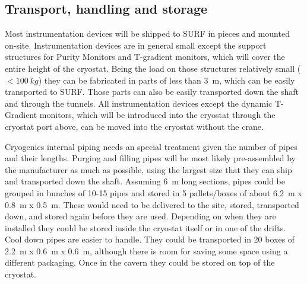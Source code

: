 \subsection{Transport, handling and storage}
\label{sec:fdgen-slow-cryo-install-transport}

Most instrumentation devices will be shipped to SURF in pieces and mounted on-site. 
Instrumentation devices are in general small except the support structures for Purity Monitors and T-gradient monitors,
which will cover the entire height of the cryostat. Being the load on those structures relatively small (\(<\SI{100}{kg}\)) they can be fabricated in parts of less than \SI{3}{m},
which can be easily transported to SURF. Those parts can also be easily transported down the shaft and through the tunnels.
All instrumentation devices except the dynamic T-Gradient monitors, which will be introduced into the cryostat through the cryostat port above, can be
moved into the cryostat without the crane.

Cryogenics internal piping needs an special treatment given the number of pipes and their lengths.
Purging and filling pipes will be most likely pre-assembled by the manufacturer as much as possible, using the largest  
size that they can ship and transported down the shaft. Assuming \SI{6}{m} long sections,
pipes could be grouped in bunches of 10-15 pipes and stored in 5 pallets/boxes of about \SI{6.2}{m} x \SI{0.8}{m} x \SI{0.5}{m}. 
These would need to be delivered to the site, stored, transported down, and stored again before they are used.
Depending on when they are installed they could be stored inside the cryostat itself or in one of the drifts. 
Cool down pipes are easier to handle. They could be transported in 20 boxes of \SI{2.2}{m} x \SI{0.6}{m} x \SI{0.6}{m}, although
there is room for saving some space using a different packaging. 
Once in the cavern they could be stored on top of the cryostat.






